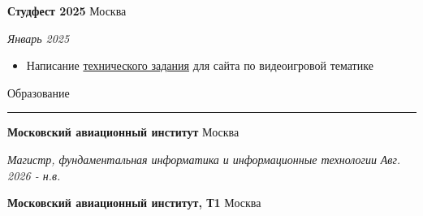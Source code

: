 \documentclass[14pt, a4paper, oneside]{extarticle}
\begin{document}

\begin{flushleft}
	\vspace{-0.8\intextsep}
	\quad
	\textbf{Студфест 2025}
	\hfill
	Москва
\end{flushleft}

\begin{flushleft}
	\vspace{-1\intextsep}
	\quad
	\hfill
	\textit{\small Январь 2025}
\end{flushleft}


\begin{itemize}
	\vspace{-2\intextsep}
	\item Написание \href{https://github.com/Crazy5202/job_application_form/tree/main/portfolio/OnlyGames%5B%D0%A2ex_%D0%97%D0%B0%D0%B4%D0%B0%D0%BD%D0%B8%D0%B5%5D.pdf}{технического задания} для сайта по видеоигровой тематике
\end{itemize}


\begin{flushleft}
	\vspace{-\intextsep}
	\large Образование
\end{flushleft}

\vspace{-0.8\intextsep}
\hrule


\begin{flushleft}
	\vspace{-0.8\intextsep}
	\quad
	\textbf{Московский авиационный институт}
	\hfill
	Москва
\end{flushleft}

\begin{flushleft}
	\vspace{-\intextsep}
	\quad
	\textit{\footnotesize Магистр, фундаментальная информатика и информационные технологии} 
	\hfill
	\textit{\small Авг. 2026 - н.в.}
\end{flushleft}


\begin{flushleft}
	\vspace{-0.8\intextsep}
	\quad
	\textbf{Московский авиационный институт, Т1}
	\hfill
	Москва
\end{flushleft}
\end{document}
